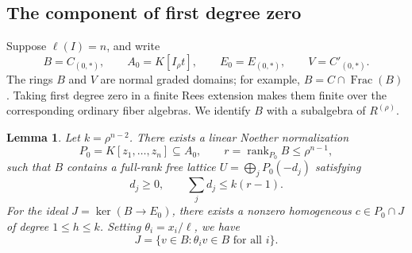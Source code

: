 \documentclass[12pt]{amsart}
\numberwithin{equation}{section}
\newtheorem{lemma}[theorem]{Lemma}
\theoremstyle{definition}
\theoremstyle{remark}
\numberwithin{equation}{section}
\DeclareMathOperator{\Frac}{Frac}
\begin{document}
\subsection{The component of first degree zero}
Suppose $\ell(I)=n$, and write
\[
B=C_{(0,*)},\qquad A_0=K[I_\rho t],\qquad
E_0=E_{(0,*)},\qquad V=C'_{(0,*)}.
\]
The rings $B$ and $V$ are normal graded domains; for example, $B=C\cap\Frac(B)$. Taking first degree zero in a finite Rees extension makes them finite over the corresponding ordinary fiber algebras. We identify $B$ with a subalgebra of $R^{(\rho)}$.
\begin{lemma}\label{lem:zero-face-lattice}
Let $k=\rho^{n-2}$. There exists a linear Noether normalization
	\[
	P_0=K[z_1,\ldots,z_n]\subseteq A_0,\qquad
	r=\operatorname{rank}_{P_0}B\le\rho^{n-1},
	\]
	such that $B$ contains a full-rank free lattice
	$U=\bigoplus_jP_0(-d_j)$ satisfying
	\[
	d_j\ge0,\qquad \sum_jd_j\le k(r-1).
	\]
	For the ideal $J=\ker(B\to E_0)$, there exists a nonzero homogeneous
	$c\in P_0\cap J$ of degree $1\le h\le k$.
Setting  $\theta_i=x_i/\ell$,  we have
	\[
	J=\{v\in B:\theta_iv\in B\text{ for all }i\}.
	\]
\end{lemma}
\end{document}
